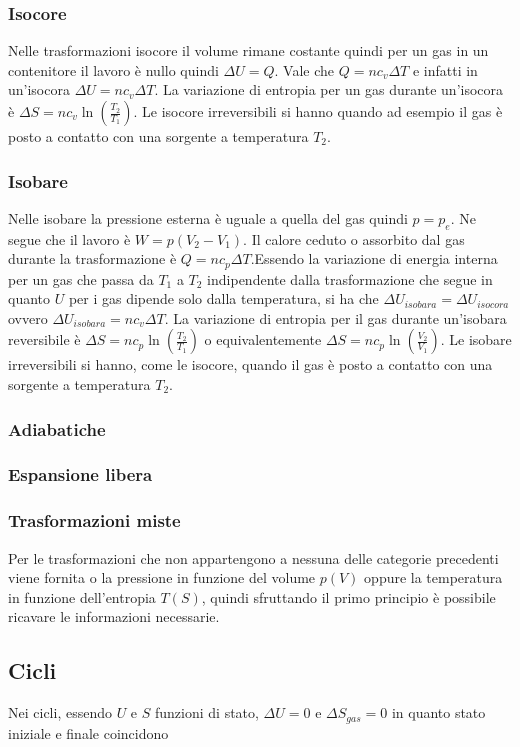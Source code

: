 \documentclass{article}
\begin{document}
\subsubsection*{Isocore}
Nelle trasformazioni isocore il volume rimane costante quindi per un gas in un contenitore il lavoro è nullo quindi $\Delta U=Q$. Vale che $Q= nc_v\Delta T$ e infatti in un'isocora $\Delta U=nc_v\Delta T$. La variazione di entropia per un gas durante un'isocora è $\Delta S=nc_v\ln({\frac{T_2}{T_1}})$. Le isocore irreversibili si hanno quando ad esempio il gas è posto a contatto con una sorgente a temperatura $T_2$. 
\subsubsection*{Isobare}
Nelle isobare la pressione esterna è uguale a quella del gas quindi $p=p_e$. Ne segue che il lavoro è $W=p(V_2-V_1)$. Il calore ceduto o assorbito dal gas durante la trasformazione è $Q=nc_p\Delta T$.Essendo la variazione di energia interna per un gas che passa da $T_1$ a $T_2$ indipendente dalla trasformazione che segue in quanto $U$ per i gas dipende solo dalla temperatura, si ha che $\Delta U_{isobara}= \Delta U_{isocora}$ ovvero $\Delta U_{isobara}=nc_v\Delta T$. La variazione di entropia per il gas durante un'isobara reversibile è $\Delta S=nc_p\ln({\frac{T_2}{T_1}})$ o equivalentemente $\Delta S=nc_p\ln({\frac{V_2}{V_1}})$.                                                                                                                              
Le isobare irreversibili si hanno, come le isocore, quando il gas è posto a contatto con una sorgente a temperatura $T_2$.
\subsubsection*{Adiabatiche}

\subsubsection*{Espansione libera}
\subsubsection*{Trasformazioni miste}
Per le trasformazioni che non appartengono a nessuna delle categorie precedenti viene fornita o la pressione in funzione del volume $p(V)$ oppure la temperatura in funzione dell'entropia $T(S)$, quindi sfruttando il primo principio è possibile ricavare le informazioni necessarie. 
\subsection*{Cicli}
Nei cicli, essendo $U$ e $S$ funzioni di stato, $\Delta U=0$ e $\Delta S_{gas}=0$ in quanto stato iniziale e finale coincidono
\end{document}
